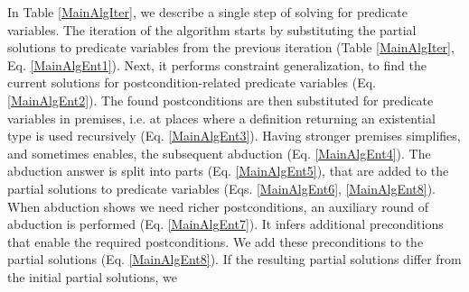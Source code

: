 \documentclass{article}
\begin{document}
In Table \ref{MainAlgIter}, we describe a single step of solving for predicate
variables. The iteration of the algorithm starts by substituting the partial
solutions to predicate variables from the previous iteration (Table
\ref{MainAlgIter}, Eq. \ref{MainAlgEnt1}). Next, it performs constraint
generalization, to find the current solutions for postcondition-related
predicate variables (Eq. \ref{MainAlgEnt2}). The found postconditions are then
substituted for predicate variables in premises, i.e. at places where a
definition returning an existential type is used recursively (Eq.
\ref{MainAlgEnt3}). Having stronger premises simplifies, and sometimes
enables, the subsequent abduction (Eq. \ref{MainAlgEnt4}). The abduction
answer is split into parts (Eq. \ref{MainAlgEnt5}), that are added to the
partial solutions to predicate variables (Eqs. \ref{MainAlgEnt6},
\ref{MainAlgEnt8}). When abduction shows we need richer postconditions, an
auxiliary round of abduction is performed (Eq. \ref{MainAlgEnt7}). It infers
additional preconditions that enable the required postconditions. We add these
preconditions to the partial solutions (Eq. \ref{MainAlgEnt8}). If the
resulting partial solutions differ from the initial partial solutions, we
\end{document}
